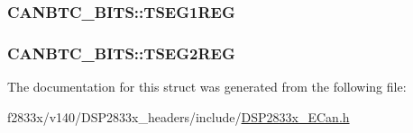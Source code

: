 \subsubsection[{T\+S\+E\+G1\+R\+E\+G}]{ C\+A\+N\+B\+T\+C\+\_\+\+B\+I\+T\+S\+::\+T\+S\+E\+G1\+R\+E\+G}\label{struct_c_a_n_b_t_c___b_i_t_s_a11366a83394bbe82e7fd2b0cbff92275}
\hypertarget{struct_c_a_n_b_t_c___b_i_t_s_a59094b1d29f7416b3f8965b0a42dfdc9}{}
\subsubsection[{T\+S\+E\+G2\+R\+E\+G}]{ C\+A\+N\+B\+T\+C\+\_\+\+B\+I\+T\+S\+::\+T\+S\+E\+G2\+R\+E\+G}\label{struct_c_a_n_b_t_c___b_i_t_s_a59094b1d29f7416b3f8965b0a42dfdc9}


The documentation for this struct was generated from the following file\+:\begin{DoxyCompactItemize}
\item 
f2833x/v140/\+D\+S\+P2833x\+\_\+headers/include/\hyperlink{_d_s_p2833x___e_can_8h}{D\+S\+P2833x\+\_\+\+E\+Can.\+h}\end{DoxyCompactItemize}
